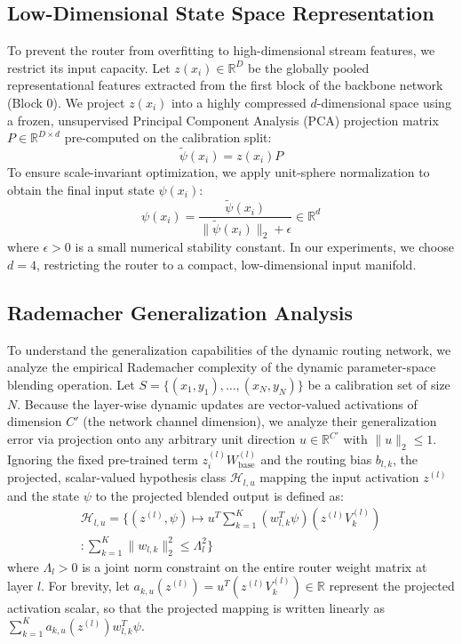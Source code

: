 \subsection{Low-Dimensional State Space Representation}
To prevent the router from overfitting to high-dimensional stream features, we restrict its input capacity. Let $z(x_i) \in \mathbb{R}^D$ be the globally pooled representational features extracted from the first block of the backbone network (Block 0). We project $z(x_i)$ into a highly compressed $d$-dimensional space using a frozen, unsupervised Principal Component Analysis (PCA) projection matrix $P \in \mathbb{R}^{D \times d}$ pre-computed on the calibration split:
\begin{equation}
    \tilde{\psi}(x_i) = z(x_i) P
\end{equation}
To ensure scale-invariant optimization, we apply unit-sphere normalization to obtain the final input state $\psi(x_i)$:
\begin{equation}
    \psi(x_i) = \frac{\tilde{\psi}(x_i)}{\|\tilde{\psi}(x_i)\|_2 + \epsilon} \in \mathbb{R}^d
\end{equation}
where $\epsilon > 0$ is a small numerical stability constant. In our experiments, we choose $d=4$, restricting the router to a compact, low-dimensional input manifold.

\subsection{Rademacher Generalization Analysis}
To understand the generalization capabilities of the dynamic routing network, we analyze the empirical Rademacher complexity of the dynamic parameter-space blending operation. 
Let $S = \{(x_1, y_1), \dots, (x_N, y_N)\}$ be a calibration set of size $N$. 
Because the layer-wise dynamic updates are vector-valued activations of dimension $C'$ (the network channel dimension), we analyze their generalization error via projection onto any arbitrary unit direction $u \in \mathbb{R}^{C'}$ with $\|u\|_2 \leq 1$. 
Ignoring the fixed pre-trained term $z_i^{(l)} W_{\text{base}}^{(l)}$ and the routing bias $b_{l, k}$, the projected, scalar-valued hypothesis class $\mathcal{H}_{l, u}$ mapping the input activation $z^{(l)}$ and the state $\psi$ to the projected blended output is defined as:
\begin{equation}
\begin{split}
    \mathcal{H}_{l, u} = \Big\{ (z^{(l)}, \psi) \mapsto u^T \sum_{k=1}^K \left( w_{l, k}^T \psi \right) \left( z^{(l)} V_k^{(l)} \right) \\
    : \sum_{k=1}^K \|w_{l, k}\|_2^2 \leq \Lambda_{l}^2 \Big\}
\end{split}
\end{equation}
where $\Lambda_{l} > 0$ is a joint norm constraint on the entire router weight matrix at layer $l$. For brevity, let $a_{k, u}(z^{(l)}) = u^T \left( z^{(l)} V_k^{(l)} \right) \in \mathbb{R}$ represent the projected activation scalar, so that the projected mapping is written linearly as $\sum_{k=1}^K a_{k, u}(z^{(l)}) w_{l, k}^T \psi$.

